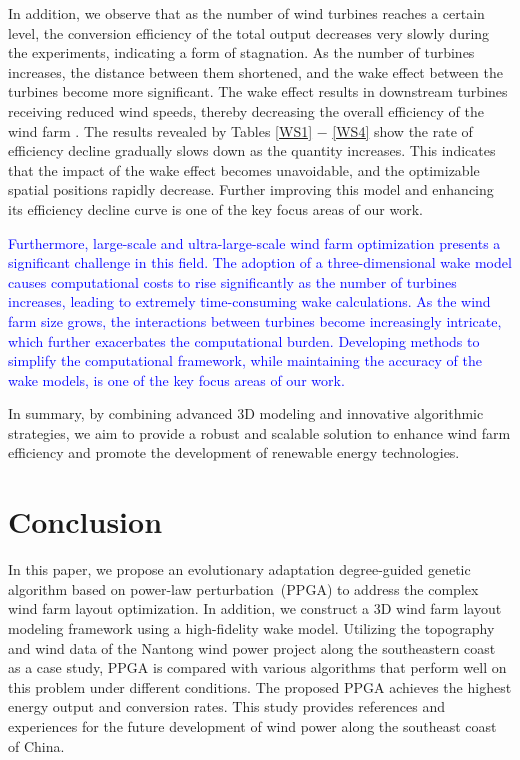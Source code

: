 \documentclass[journal,twoside]{IEEEtran}
\begin{document}
In addition, we observe that as the number of wind turbines reaches a certain level, the conversion efficiency of the total output decreases very slowly during the experiments, indicating a form of stagnation. As the number of turbines increases, the distance between them shortened, and the wake effect between the turbines become more significant. The wake effect results in downstream turbines receiving reduced wind speeds, thereby decreasing the overall efficiency of the wind farm \cite{9930666}. The results revealed by Tables \ref{WS1} $-$ \ref{WS4} show the rate of efficiency decline gradually slows down as the quantity increases. This indicates that the impact of the wake effect becomes unavoidable, and the optimizable spatial positions rapidly decrease. Further improving this model and enhancing its efficiency decline curve is one of the key focus areas of our work.

\textcolor{blue}{Furthermore, large-scale and ultra-large-scale wind farm optimization presents a significant challenge in this field. The adoption of a three-dimensional wake model causes computational costs to rise significantly as the number of turbines increases, leading to extremely time-consuming wake calculations. As the wind farm size grows, the interactions between turbines become increasingly intricate, which further exacerbates the computational burden. Developing methods to simplify the computational framework, while maintaining the accuracy of the wake models, is one of the key focus areas of our work.}

In summary, by combining advanced 3D modeling and innovative algorithmic strategies, we aim to provide a robust and scalable solution to enhance wind farm efficiency and promote the development of renewable energy technologies.	
\section{Conclusion}
\label{sec_conclusion}
In this paper, we propose an evolutionary adaptation degree-guided genetic algorithm based on power-law perturbation~(PPGA) to address the complex wind farm layout optimization. In addition, we construct a 3D wind farm layout modeling framework using a high-fidelity wake model. Utilizing the topography and wind data of the Nantong wind power project along the southeastern coast as a case study, PPGA is compared with various algorithms that perform well on this problem under different conditions. The proposed PPGA achieves the highest energy output and conversion rates. This study provides references and experiences for the future development of wind power along the southeast coast of China.
 
\end{document}
